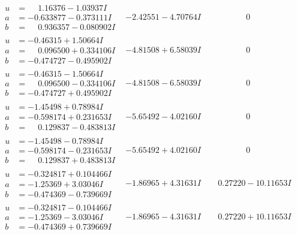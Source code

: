 \documentclass[1p]{elsarticle_modified}
\theoremstyle{definition}
\begin{document}
$$\begin{array}{c|c|c}
\begin{aligned}
u &= \phantom{-}1.16376 - 1.03937 I \\
a &= -0.633877 - 0.373111 I \\
b &= \phantom{-}0.936357 - 0.080902 I\end{aligned}
 & -2.42551 - 4.70764 I & \phantom{-0.000000 } 0 \\ \hline\begin{aligned}
u &= -0.46315 + 1.50664 I \\
a &= \phantom{-}0.096500 + 0.334106 I \\
b &= -0.474727 - 0.495902 I\end{aligned}
 & -4.81508 + 6.58039 I & \phantom{-0.000000 } 0 \\ \hline\begin{aligned}
u &= -0.46315 - 1.50664 I \\
a &= \phantom{-}0.096500 - 0.334106 I \\
b &= -0.474727 + 0.495902 I\end{aligned}
 & -4.81508 - 6.58039 I & \phantom{-0.000000 } 0 \\ \hline\begin{aligned}
u &= -1.45498 + 0.78984 I \\
a &= -0.598174 + 0.231653 I \\
b &= \phantom{-}0.129837 - 0.483813 I\end{aligned}
 & -5.65492 - 4.02160 I & \phantom{-0.000000 } 0 \\ \hline\begin{aligned}
u &= -1.45498 - 0.78984 I \\
a &= -0.598174 - 0.231653 I \\
b &= \phantom{-}0.129837 + 0.483813 I\end{aligned}
 & -5.65492 + 4.02160 I & \phantom{-0.000000 } 0 \\ \hline\begin{aligned}
u &= -0.324817 + 0.104466 I \\
a &= -1.25369 + 3.03046 I \\
b &= -0.474369 - 0.739669 I\end{aligned}
 & -1.86965 + 4.31631 I & \phantom{-}0.27220 - 10.11653 I \\ \hline\begin{aligned}
u &= -0.324817 - 0.104466 I \\
a &= -1.25369 - 3.03046 I \\
b &= -0.474369 + 0.739669 I\end{aligned}
 & -1.86965 - 4.31631 I & \phantom{-}0.27220 + 10.11653 I \\ \hline\begin{aligned}

\end{aligned}
\end{array}$$
\end{document}
